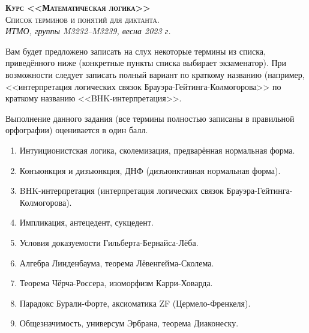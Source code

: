 \documentclass[11pt,a4paper,oneside]{scrartcl}
\begin{document}
\pagestyle{empty}

\begin{center}
{\large\scshape\bfseries Курс <<Математическая логика>>}\\
{\large\scshape Список терминов и понятий для диктанта.}\\
\itshape ИТМО, группы M3232--M3239, весна 2023 г.
\end{center}


Вам будет предложено записать на слух некоторые термины из списка, приведённого ниже 
(конкретные пункты списка выбирает экзаменатор). При возможности следует записать полный вариант 
по краткому названию (например, <<интерпретация логических связок Брауэра-Гейтинга-Колмогорова>> 
по краткому названию <<BHK-интерпретация>>.

Выполнение данного задания (все термины полностью записаны в правильной орфографии) 
оценивается в один балл.

\begin{enumerate}
\item Интуиционистская логика, сколемизация, предварённая нормальная форма.
\item Конъюнкция и дизъюнкция, ДНФ (дизъюнктивная нормальная форма).
\item BHK-интерпретация (интерпретация логических связок Брауэра-Гейтинга-Колмогорова).
\item Импликация, антецедент, сукцедент.
\item Условия доказуемости Гильберта-Бернайса-Лёба.
\item Алгебра Линденбаума, теорема Лёвенгейма-Сколема.
\item Теорема Чёрча-Россера, изоморфизм Карри-Ховарда.
\item Парадокс Бурали-Форте, аксиоматика ZF (Цермело-Френкеля).
\item Общезначимость, универсум Эрбрана, теорема Диаконеску.
\end{enumerate}
\end{document}
